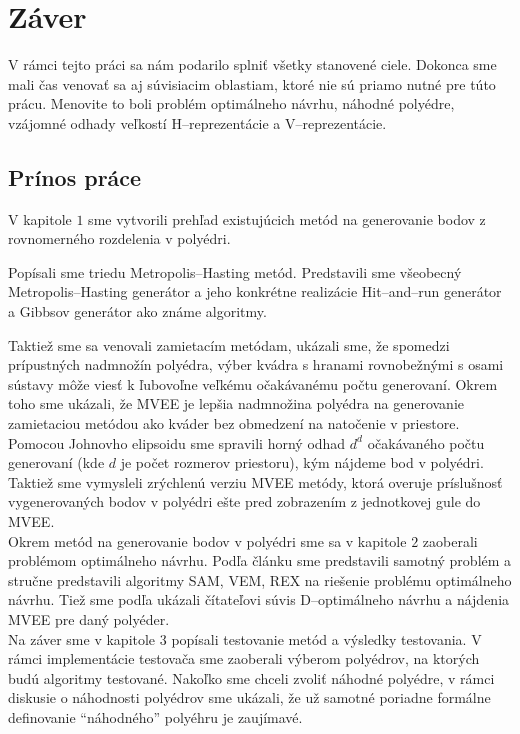 \chapter*{Záver}  %

V rámci tejto práci sa nám podarilo splniť všetky stanovené ciele. Dokonca sme mali čas venovať sa aj súvisiacim oblastiam, ktoré nie sú priamo nutné pre túto prácu. Menovite to boli problém optimálneho návrhu, náhodné polyédre, vzájomné odhady veľkostí H--reprezentácie a V--reprezentácie.

\section{Prínos práce}
V kapitole $1$ sme vytvorili prehľad existujúcich metód na generovanie bodov z rovnomerného rozdelenia v polyédri.

Popísali sme triedu Metropolis--Hasting metód. Predstavili sme všeobecný Metropolis--Hasting generátor a jeho konkrétne realizácie Hit--and--run generátor a Gibbsov generátor ako známe algoritmy.

Taktiež sme sa venovali zamietacím metódam, ukázali sme, že spomedzi prípustných nadmnožín polyédra, výber kvádra s hranami rovnobežnými s osami sústavy môže viesť k ľubovoľne veľkému očakávanému počtu generovaní. Okrem toho sme ukázali, že MVEE je lepšia nadmnožina polyédra na generovanie zamietaciou metódou ako kváder bez obmedzení na natočenie v priestore. Pomocou Johnovho elipsoidu sme spravili horný odhad $d^d$ očakávaného počtu generovaní (kde $d$ je počet rozmerov priestoru), kým nájdeme bod v polyédri. Taktiež sme vymysleli zrýchlenú verziu MVEE metódy, ktorá overuje príslušnosť vygenerovaných bodov v polyédri ešte pred zobrazením z jednotkovej gule do MVEE.\\

Okrem metód na generovanie bodov v polyédri sme sa v kapitole $2$ zaoberali problémom optimálneho návrhu. Podľa článku \cite{rex_harman} sme predstavili samotný problém a stručne predstavili algoritmy SAM, VEM, REX na riešenie problému optimálneho návrhu. Tiež sme podľa \cite{rex_harman} ukázali čítateľovi súvis D--optimálneho návrhu a nájdenia MVEE pre daný polyéder.\\

Na záver sme v kapitole $3$ popísali testovanie metód a výsledky testovania. V rámci implementácie testovača sme zaoberali výberom polyédrov, na ktorých budú algoritmy testované. Nakoľko sme chceli zvoliť náhodné polyédre, v rámci diskusie o náhodnosti polyédrov sme ukázali, že už samotné poriadne formálne definovanie ``náhodného'' polyéhru je zaujímavé.

